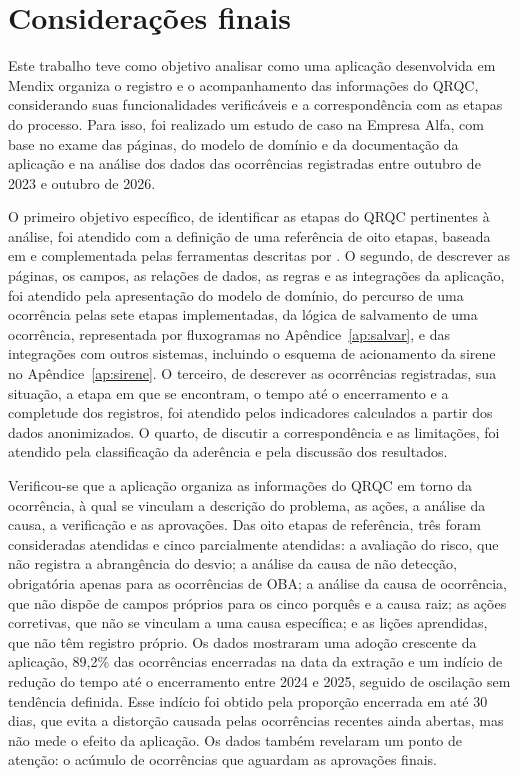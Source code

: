 \chapter{Considerações finais}
\label{cap:conclusao}

Este trabalho teve como objetivo analisar como uma aplicação desenvolvida em Mendix organiza o registro e o acompanhamento das informações do QRQC, considerando suas funcionalidades verificáveis e a correspondência com as etapas do processo. Para isso, foi realizado um estudo de caso na Empresa Alfa, com base no exame das páginas, do modelo de domínio e da documentação da aplicação e na análise dos dados das ocorrências registradas entre outubro de 2023 e outubro de 2026.

O primeiro objetivo específico, de identificar as etapas do QRQC pertinentes à análise, foi atendido com a definição de uma referência de oito etapas, baseada em  e complementada pelas ferramentas descritas por . O segundo, de descrever as páginas, os campos, as relações de dados, as regras e as integrações da aplicação, foi atendido pela apresentação do modelo de domínio, do percurso de uma ocorrência pelas sete etapas implementadas, da lógica de salvamento de uma ocorrência, representada por fluxogramas no Apêndice~\ref{ap:salvar}, e das integrações com outros sistemas, incluindo o esquema de acionamento da sirene no Apêndice~\ref{ap:sirene}. O terceiro, de descrever as ocorrências registradas, sua situação, a etapa em que se encontram, o tempo até o encerramento e a completude dos registros, foi atendido pelos indicadores calculados a partir dos dados anonimizados. O quarto, de discutir a correspondência e as limitações, foi atendido pela classificação da aderência e pela discussão dos resultados.

Verificou-se que a aplicação organiza as informações do QRQC em torno da ocorrência, à qual se vinculam a descrição do problema, as ações, a análise da causa, a verificação e as aprovações. Das oito etapas de referência, três foram consideradas atendidas e cinco parcialmente atendidas: a avaliação do risco, que não registra a abrangência do desvio; a análise da causa de não detecção, obrigatória apenas para as ocorrências de OBA; a análise da causa de ocorrência, que não dispõe de campos próprios para os cinco porquês e a causa raiz; as ações corretivas, que não se vinculam a uma causa específica; e as lições aprendidas, que não têm registro próprio. Os dados mostraram uma adoção crescente da aplicação, 89,2\% das ocorrências encerradas na data da extração e um indício de redução do tempo até o encerramento entre 2024 e 2025, seguido de oscilação sem tendência definida. Esse indício foi obtido pela proporção encerrada em até 30 dias, que evita a distorção causada pelas ocorrências recentes ainda abertas, mas não mede o efeito da aplicação. Os dados também revelaram um ponto de atenção: o acúmulo de ocorrências que aguardam as aprovações finais.

